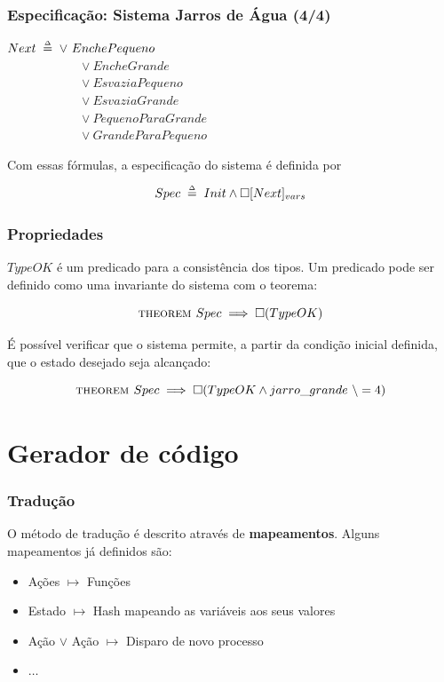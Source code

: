 \documentclass{beamer}
\begin{document}
\begin{frame}
  \frametitle{Especificação: Sistema Jarros de Água (4/4)}

  $Next \defeq \lor\ EnchePequeno$\\
  ~~~~~~~~~~~~$\lor\ EncheGrande$\\
  ~~~~~~~~~~~~$\lor\ EsvaziaPequeno$\\
  ~~~~~~~~~~~~$\lor\ EsvaziaGrande$\\
  ~~~~~~~~~~~~$\lor\ PequenoParaGrande$\\
  ~~~~~~~~~~~~$\lor\ GrandeParaPequeno$\\\bigskip

  Com essas fórmulas, a especificação do sistema é definida por

  \[Spec \;\mathrel{\smash {{\stackrel{\scriptscriptstyle\Delta}{=}}}}\; Init \land \square [Next]_{vars}\]
\end{frame}

\begin{frame}
  \frametitle{Propriedades}

  $TypeOK$ é um predicado para a consistência dos tipos. Um predicado pode ser definido como uma invariante do sistema com o teorema:

  \[\textsc{theorem } Spec \implies \square (TypeOK)\]\medskip

  É possível verificar que o sistema permite, a partir da condição inicial definida, que o estado desejado seja alcançado:

  \[\textsc{theorem } Spec \implies \square (TypeOK \land jarro\_grande\ \backslash= 4)\]
\end{frame}

\section{Gerador de código}

\begin{frame}
  \frametitle{Tradução}
  O método de tradução é descrito através de \textbf{mapeamentos}. Alguns mapeamentos já definidos são:
  \begin{itemize}
    \item Ações $\mapsto$ Funções
    \item Estado $\mapsto$ Hash mapeando as variáveis aos seus valores
    \item Ação $\lor$ Ação $\mapsto$ Disparo de novo processo
    \item $\dots$
  \end{itemize}



\end{frame}
\end{document}

